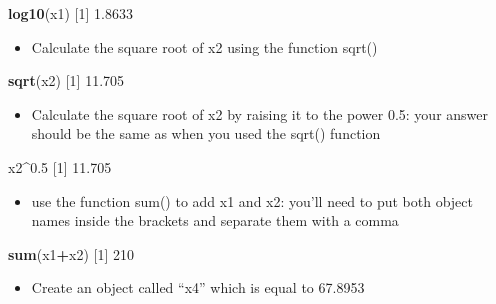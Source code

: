 \documentclass[
]{book}
\newenvironment{Shaded}{\begin{snugshade}}{\end{snugshade}}
\newcommand{\DecValTok}[1]{\textcolor[rgb]{0.00,0.00,0.81}{#1}}
\newcommand{\FloatTok}[1]{\textcolor[rgb]{0.00,0.00,0.81}{#1}}
\newcommand{\KeywordTok}[1]{\textcolor[rgb]{0.13,0.29,0.53}{\textbf{#1}}}
\newcommand{\NormalTok}[1]{#1}
\newcommand{\OperatorTok}[1]{\textcolor[rgb]{0.81,0.36,0.00}{\textbf{#1}}}
\providecommand{\tightlist}{%
  \setlength{\itemsep}{0pt}\setlength{\parskip}{0pt}}
\begin{document}
\begin{Shaded}
\begin{Highlighting}[]
\KeywordTok{log10}\NormalTok{(x1)}
\NormalTok{[}\DecValTok{1}\NormalTok{] }\FloatTok{1.8633}
\end{Highlighting}
\end{Shaded}

\begin{itemize}
\tightlist
\item
  Calculate the square root of x2 using the function sqrt()
\end{itemize}

\begin{Shaded}
\begin{Highlighting}[]
\KeywordTok{sqrt}\NormalTok{(x2)}
\NormalTok{[}\DecValTok{1}\NormalTok{] }\FloatTok{11.705}
\end{Highlighting}
\end{Shaded}

\begin{itemize}
\tightlist
\item
  Calculate the square root of x2 by raising it to the power 0.5: your answer should be the same as when you
  used the sqrt() function
\end{itemize}

\begin{Shaded}
\begin{Highlighting}[]
\NormalTok{x2}\OperatorTok{^}\FloatTok{0.5}
\NormalTok{[}\DecValTok{1}\NormalTok{] }\FloatTok{11.705}
\end{Highlighting}
\end{Shaded}

\begin{itemize}
\tightlist
\item
  use the function sum() to add x1 and x2: you'll need to put both object names inside the brackets and
  separate them with a comma
\end{itemize}

\begin{Shaded}
\begin{Highlighting}[]
\KeywordTok{sum}\NormalTok{(x1}\OperatorTok{+}\NormalTok{x2)}
\NormalTok{[}\DecValTok{1}\NormalTok{] }\DecValTok{210}
\end{Highlighting}
\end{Shaded}

\begin{itemize}
\tightlist
\item
  Create an object called ``x4'' which is equal to 67.8953
\end{itemize}
\end{document}
